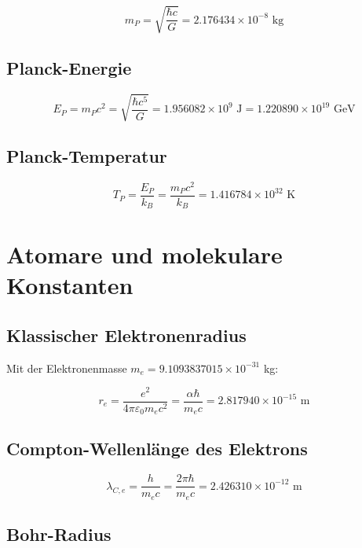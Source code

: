 	\begin{equation}
		m_P = \sqrt{\frac{\hbar c}{G}} = 2.176434 \times 10^{-8} \text{ kg}
	\end{equation}
	
	\subsection{Planck-Energie}
	
	\begin{equation}
		E_P = m_P c^2 = \sqrt{\frac{\hbar c^5}{G}} = 1.956082 \times 10^9 \text{ J} = 1.220890 \times 10^{19} \text{ GeV}
	\end{equation}
	
	\subsection{Planck-Temperatur}
	
	\begin{equation}
		T_P = \frac{E_P}{k_B} = \frac{m_P c^2}{k_B} = 1.416784 \times 10^{32} \text{ K}
	\end{equation}
	
	\section{Atomare und molekulare Konstanten}
	
	\subsection{Klassischer Elektronenradius}
	
	Mit der Elektronenmasse $m_e = 9.1093837015 \times 10^{-31}$ kg:
	
	\begin{equation}
		r_e = \frac{e^2}{4\pi\varepsilon_0 m_e c^2} = \frac{\alpha \hbar}{m_e c} = 2.817940 \times 10^{-15} \text{ m}
	\end{equation}
	
	\subsection{Compton-Wellenlänge des Elektrons}
	
	\begin{equation}
		\lambda_{C,e} = \frac{h}{m_e c} = \frac{2\pi\hbar}{m_e c} = 2.426310 \times 10^{-12} \text{ m}
	\end{equation}
	
	\subsection{Bohr-Radius}
	

